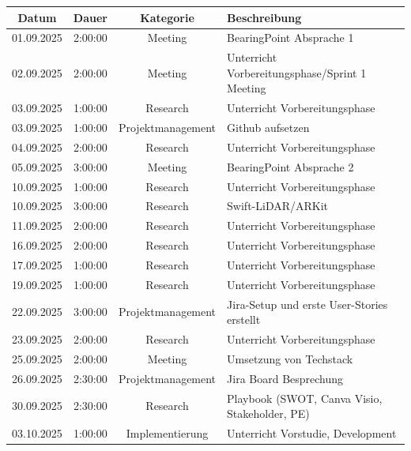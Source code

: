 \documentclass{article}
\begin{document}
\begin{table}[H]
  \centering
  \begin{tabularx}{\textwidth}{|c|c|c|X|}
    \hline
    \rowcolor{black!10}\textbf{Datum} & \textbf{Dauer} & \textbf{Kategorie} & \textbf{Beschreibung} \\
    \hline
    01.09.2025 & 2:00:00 & Meeting           & BearingPoint Absprache 1 \\ \hline
    02.09.2025 & 2:00:00 & Meeting           & Unterricht Vorbereitungsphase/Sprint 1 Meeting \\ \hline
    03.09.2025 & 1:00:00 & Research          & Unterricht Vorbereitungsphase \\ \hline
    03.09.2025 & 1:00:00 & Projektmanagement & Github aufsetzen \\ \hline
    04.09.2025 & 2:00:00 & Research          & Unterricht Vorbereitungsphase \\ \hline
    05.09.2025 & 3:00:00 & Meeting           & BearingPoint Absprache 2 \\ \hline
    10.09.2025 & 1:00:00 & Research          & Unterricht Vorbereitungsphase \\ \hline
    10.09.2025 & 3:00:00 & Research          & Swift-LiDAR/ARKit \\ \hline
    11.09.2025 & 2:00:00 & Research          & Unterricht Vorbereitungsphase \\ \hline
    16.09.2025 & 2:00:00 & Research          & Unterricht Vorbereitungsphase \\ \hline
    17.09.2025 & 1:00:00 & Research          & Unterricht Vorbereitungsphase \\ \hline
    19.09.2025 & 1:00:00 & Research          & Unterricht Vorbereitungsphase \\ \hline
    22.09.2025 & 3:00:00 & Projektmanagement & Jira-Setup und erste User-Stories erstellt \\ \hline
    23.09.2025 & 2:00:00 & Research          & Unterricht Vorbereitungsphase \\ \hline
    25.09.2025 & 2:00:00 & Meeting           & Umsetzung von Techstack \\ \hline
    26.09.2025 & 2:30:00 & Projektmanagement & Jira Board Besprechung \\ \hline
    30.09.2025 & 2:30:00 & Research          & Playbook (SWOT, Canva Visio, Stakeholder, PE) \\ \hline
    03.10.2025 & 1:00:00 & Implementierung   & Unterricht Vorstudie, Development \\ \hline

\end{tabularx}
\end{table}
\end{document}
